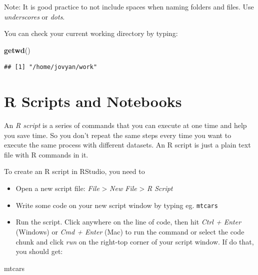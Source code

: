 \documentclass[]{book}
\newenvironment{Shaded}{\begin{snugshade}}{\end{snugshade}}
\newcommand{\KeywordTok}[1]{\textcolor[rgb]{0.13,0.29,0.53}{\textbf{#1}}}
\newcommand{\NormalTok}[1]{#1}
\begin{document}
Note: It is good practice to not include spaces when naming folders and files. Use \emph{underscores} or \emph{dots}.

You can check your current working directory by typing:

\begin{Shaded}
\begin{Highlighting}[]
\KeywordTok{getwd}\NormalTok{()}
\end{Highlighting}
\end{Shaded}

\begin{verbatim}
## [1] "/home/jovyan/work"
\end{verbatim}

\hypertarget{r-scripts-and-notebooks}{%
\section{R Scripts and Notebooks}\label{r-scripts-and-notebooks}}

An \emph{R script} is a series of commands that you can execute at one time and help you save time. So you don't repeat the same steps every time you want to execute the same process with different datasets. An R script is just a plain text file with R commands in it.

To create an R script in RStudio, you need to

\begin{itemize}
\item
  Open a new script file: \emph{File} \textgreater{} \emph{New File} \textgreater{} \emph{R Script}
\item
  Write some code on your new script window by typing eg. \texttt{mtcars}
\item
  Run the script. Click anywhere on the line of code, then hit \emph{Ctrl + Enter} (Windows) or \emph{Cmd + Enter} (Mac) to run the command or select the code chunk and click \emph{run} on the right-top corner of your script window. If do that, you should get:
\end{itemize}

\begin{Shaded}
\begin{Highlighting}[]
\NormalTok{mtcars}
\end{Highlighting}
\end{Shaded}
\end{document}
